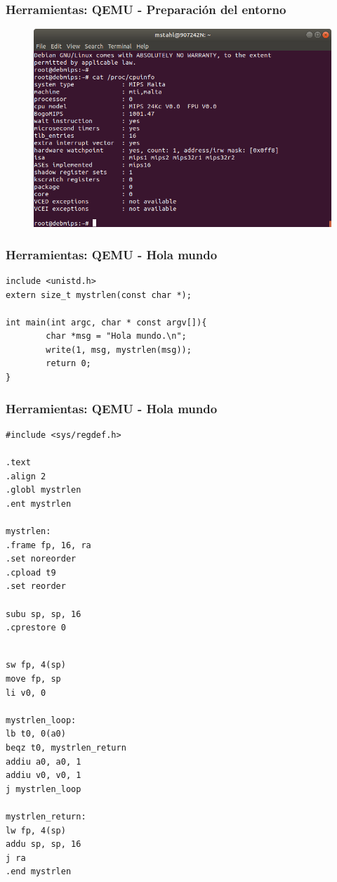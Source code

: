 \documentclass{beamer}
\begin{document}
    \begin{frame}[fragile]
 \frametitle{Herramientas: QEMU - Preparación del entorno} 
\begin{figure}[h!]
 \centering
 \includegraphics[scale=.4,keepaspectratio=true]{./gfx/DebianMips.png}
\end{figure} 
  \end{frame}

  \begin{frame}[fragile]
 \frametitle{Herramientas: QEMU - Hola mundo} 

\begin{lstlisting}
include <unistd.h>
extern size_t mystrlen(const char *);

int main(int argc, char * const argv[]){
        char *msg = "Hola mundo.\n";
        write(1, msg, mystrlen(msg));
        return 0;
}

\end{lstlisting}
\end{frame}

  \begin{frame}[fragile]
 \frametitle{Herramientas: QEMU - Hola mundo} 
\begin{multicols}{2}
\begin{lstlisting}
#include <sys/regdef.h>

.text
.align 2
.globl mystrlen
.ent mystrlen

mystrlen:
.frame fp, 16, ra
.set noreorder
.cpload t9
.set reorder

subu sp, sp, 16
.cprestore 0


\end{lstlisting}

\columnbreak
\begin{lstlisting}
sw fp, 4(sp)
move fp, sp
li v0, 0

mystrlen_loop:
lb t0, 0(a0)
beqz t0, mystrlen_return
addiu a0, a0, 1
addiu v0, v0, 1
j mystrlen_loop

mystrlen_return:
lw fp, 4(sp)
addu sp, sp, 16
j ra
.end mystrlen
\end{lstlisting}
\end{multicols}
\end{frame}
\end{document}
